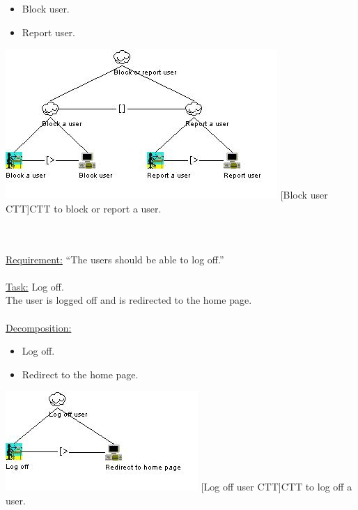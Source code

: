 \documentclass[11pt, a4paper,svglistings,oneside]{book}
\begin{document}
\begin{itemize}
\item Block user.
\item Report user.
\end{itemize}
\noindent\begin{minipage}{\textwidth}
    \centering
   \includegraphics{CTT_Block.png}
 [Block user CTT]{CTT to block or report a user.}
\end{minipage}
$\;$ \\ \\
\underline{Requirement:} ``The users should be able to log off.'' \\ \\
\underline{Task:} Log off. \\
The user is logged off and is redirected to the home page. \\ \\
\underline{Decomposition:}
\begin{itemize}
\item Log off.
\item Redirect to the home page.
\end{itemize}
\noindent\begin{minipage}{\textwidth}
    \centering
   \includegraphics{CTT_Logoff.png}
 [Log off user CTT]{CTT to log off a user.}
\end{minipage}
$\;$ \\ \\
\end{document}
